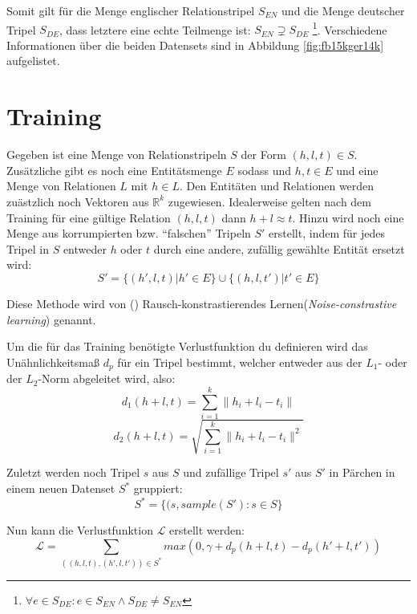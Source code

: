 Somit gilt für die Menge englischer Relationstripel $S_{EN}$ und die Menge deutscher Tripel $S_{DE}$, dass letztere
eine echte Teilmenge ist: $S_{EN} \supsetneq S_{DE}$ \footnote{$\forall e \in S_{DE}: e \in S_{EN} \wedge S_{DE} \neq S_{EN}$}.
Verschiedene Informationen über die beiden Datensets sind in Abbildung \ref{fig:fb15kger14k} aufgelistet.

\section{Training}

Gegeben ist eine Menge von Relationstripeln $S$ der Form $(h, l, t) \in S$. Zusätzliche gibt es noch eine Entitätsmenge
$E$ sodass und $h, t \in E$ und eine Menge von Relationen $L$ mit $h \in L$. Den Entitäten und Relationen werden zuästzlich
noch Vektoren aus $\mathbb{R}^k$ zugewiesen. Idealerweise gelten nach dem Training für eine gültige Relation $(h, l, t)$
dann $h + l \approx t$. Hinzu wird noch eine Menge aus korrumpierten bzw. ``falschen'' Tripeln $S'$ erstellt, indem
für jedes Tripel in $S$ entweder $h$ oder $t$ durch eine andere, zufällig gewählte Entität ersetzt wird:
\begin{equation}
  S' = \{(h', l, t) | h' \in E\} \cup \{(h, l, t') | t' \in E\}
\end{equation}

Diese Methode wird von (\cite{bordes2013translating}) Rausch-konstrastierendes Lernen(\emph{Noise-constrastive learning})
genannt.

Um die für das Training benötigte Verlustfunktion du definieren wird das Unähnlichkeitsmaß $d_p$ für ein Tripel bestimmt, welcher
entweder aus der $L_1$- oder der $L_2$-Norm abgeleitet wird, also:
\begin{equation}
    d_1(h + l, t) = \sum_{i=1}^k \| h_i + l_i - t_i \|
\end{equation}
\begin{equation}
    d_2(h + l, t) = \sqrt{\sum_{i=1}^k \| h_i + l_i - t_i \|^2}
\end{equation}

Zuletzt werden noch Tripel $s$ aus $S$ und zufällige Tripel $s'$ aus $S'$ in Pärchen in einem neuen Datenset $S^*$ gruppiert:
\begin{equation}
  S^* = \{(s, sample(S'): s \in S\}
\end{equation}

Nun kann die Verlustfunktion $\mathcal{L}$ erstellt werden:
\begin{equation}
  \mathcal{L} = \sum_{((h,l,t), (h', l, t')) \in S^*} max(0, \gamma + d_p(h + l, t) - d_p(h' + l, t'))
\end{equation}


